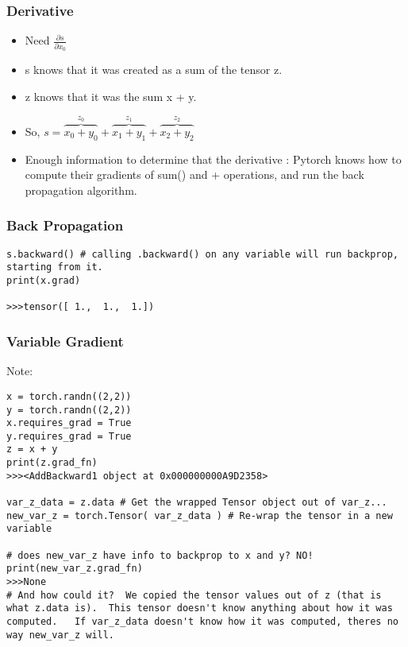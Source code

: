 \begin{frame}[fragile]
\frametitle{Derivative}
\begin{itemize}
\item Need $\frac{\partial s}{\partial x_0}$
\item s knows that it was created as a sum of the tensor z. 
\item z knows that it was the sum x + y. 
\item So, $s = \overbrace{x_0 + y_0}^\text{$z_0$} + \overbrace{x_1 + y_1}^\text{$z_1$} + \overbrace{x_2 + y_2}^\text{$z_2$}$
\item Enough information to determine that the derivative : Pytorch knows how to compute their gradients of sum() and + operations, and run the back propagation algorithm. 
\end{itemize}


\end{frame} 
 
\begin{frame}[fragile]
\frametitle{Back Propagation}

 \begin{lstlisting}
s.backward() # calling .backward() on any variable will run backprop, starting from it.
print(x.grad)

>>>tensor([ 1.,  1.,  1.])
 \end{lstlisting}

\end{frame} 
 
 
\begin{frame}[fragile]
\frametitle{Variable Gradient}
Note:
 \begin{lstlisting}
x = torch.randn((2,2))
y = torch.randn((2,2))
x.requires_grad = True
y.requires_grad = True
z = x + y 
print(z.grad_fn)
>>><AddBackward1 object at 0x000000000A9D2358>

var_z_data = z.data # Get the wrapped Tensor object out of var_z...
new_var_z = torch.Tensor( var_z_data ) # Re-wrap the tensor in a new variable

# does new_var_z have info to backprop to x and y? NO!
print(new_var_z.grad_fn)
>>>None
# And how could it?  We copied the tensor values out of z (that is what z.data is).  This tensor doesn't know anything about how it was computed.   If var_z_data doesn't know how it was computed, theres no way new_var_z will.
\end{lstlisting}

\end{frame} 
 
